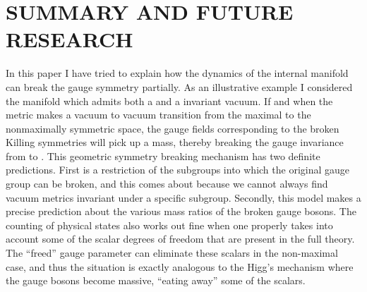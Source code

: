 \documentclass[a4paper,12pt]{article}
\begin{document}
\section{{\bf SUMMARY AND FUTURE RESEARCH}} 

In this paper I have tried to explain how the dynamics of the internal manifold can break the gauge symmetry partially. As an illustrative example I considered the manifold \coordHE{} which admits both a \coordHE{} and a  \coordHE{} invariant vacuum. If and when the metric makes a vacuum to vacuum transition from the maximal to the nonmaximally symmetric space, the gauge fields corresponding to the broken Killing symmetries will pick up a mass, thereby breaking the gauge invariance from \coordHE{} to \coordHE{}. This geometric symmetry breaking mechanism  has two definite predictions. First is a restriction of the subgroups into which the original gauge group can be broken, and this comes about because we cannot always find vacuum metrics invariant under a specific subgroup. Secondly, this model makes a precise prediction about the various mass ratios of the broken gauge bosons. The counting of physical states also works out fine when one properly takes into account some of the scalar degrees of freedom that are present in the full theory. The ``freed'' gauge parameter can eliminate these scalars in the non-maximal case, and thus the situation is exactly analogous to the Higg's mechanism where the gauge bosons become massive, ``eating away'' some of the scalars.
\end{document}
